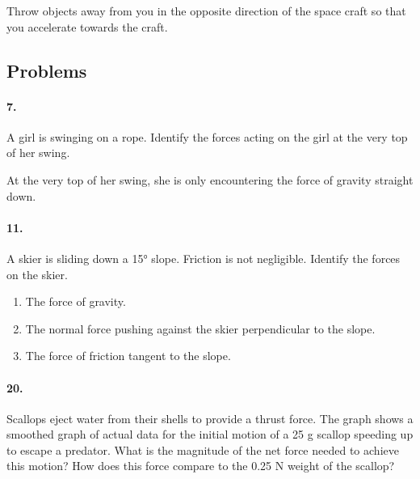 \begin{multicols*}{2}
        \begin{mdframed}
            Throw objects away from you in the opposite direction of the space craft so that you accelerate towards the craft.
        \end{mdframed}

        \subsection*{Problems}

        \paragraph*{7.}
        A girl is swinging on a rope. Identify the forces acting on the girl at the very top of her swing.

        \begin{mdframed}
            At the very top of her swing, she is only encountering the force of gravity straight down.
        \end{mdframed}

        \paragraph*{11.}
        A skier is sliding down a 15° slope. Friction is not negligible.
        Identify the forces on the skier.

        \begin{mdframed}
            \begin{enumerate}
                \item The force of gravity.
                \item The normal force pushing against the skier perpendicular to the slope.
                \item The force of friction tangent to the slope.
            \end{enumerate}
        \end{mdframed}

        \paragraph*{20.}
        Scallops eject water from their shells to provide a thrust force. The graph shows a smoothed graph of actual data for the initial motion of a 25 g scallop speeding up to escape a predator. What is the magnitude of the net force needed to achieve this motion? How does this force compare to the 0.25 N weight of the scallop?


\end{multicols*}
